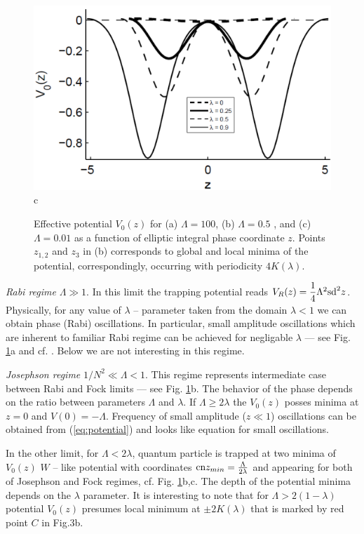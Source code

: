 \documentclass[aps, pre, preprint, groupedaddress, superscriptaddress, showkeys, showpacs] {revtex4-1}
\begin{document}
\begin{figure}[ht]
\begin{minipage}[htbp]{0.32\linewidth}	{\includegraphics[width=1\linewidth]{pic/potential_L=001.png} \\ c}
\end{minipage}
\caption{
Effective potential $V_0(z)$ for (a) $\Lambda = 100$, (b) $\Lambda = 0.5$ , and (c) $\Lambda = 0.01$ as a function of  elliptic integral phase coordinate $z$.
Points $z_{1,2}$ and $z_{3}$ in (b) corresponds to global and local minima of the potential, correspondingly,  occurring with periodicity $4K(\lambda)$. \label{phase_potential}}
\end{figure}
%

\textit{Rabi regime} $\Lambda \gg 1$. In this limit the trapping potential reads $V_R(z) = \dfrac{1}{4} \Lambda^2 \textrm{sd}^2{z}$.
Physically, for any value of $\lambda$ -- parameter taken from the domain $\lambda <1$ we can obtain phase (Rabi) oscillations.
In particular, small amplitude oscillations which are inherent to familiar Rabi regime can be achieved for negligable $\lambda$ --- see Fig. \ref{phase_potential}a and cf. \cite{Anglin}.
Below we are not interesting in this regime. 

\textit{Josephson regime} $1/N^2\ll\Lambda <1$.
This regime represents intermediate case between Rabi and Fock limits --- see Fig. \ref{phase_potential}b.
The behavior of the phase depends on the ratio between parameters $\Lambda$ and $\lambda$.
If $\Lambda \ge 2\lambda$ the $V_0(z)$ posses minima at $z = 0$ and $V(0) = -\Lambda$.
Frequency of small amplitude ($z \ll 1$) oscillations can be obtained from (\ref{eq:potential}) and looks like {\red equation for small oscillations}.

In the other limit, for $\Lambda < 2 \lambda$, quantum particle is trapped at two minima of $V_0(z)$ $W$ -- like potential with coordinates $\textrm{cn}{z_{min}} = \frac{\Lambda}{2 \lambda}$ and appearing for both of Josephson and Fock regimes, cf. Fig. \ref{phase_potential}b,c.  
The depth of the potential minima depends on the $\lambda$ parameter.
It is interesting to note that for $\Lambda > 2(1 - \lambda)$ potential $V_0(z)$ presumes local minimum at $\pm 2 K(\lambda)$ that is marked by red point $C$ in Fig.3b.
\end{document}
